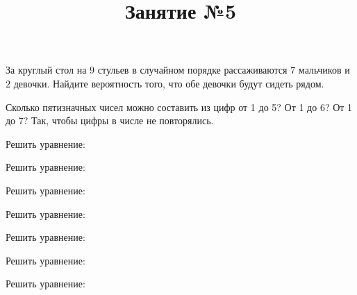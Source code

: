 \title{Занятие №5}
\begin{listofex}
	\item За круглый стол на \( 9 \) стульев в случайном порядке рассаживаются \( 7 \) мальчиков и \( 2 \) девочки. Найдите вероятность того, что обе девочки будут сидеть рядом.
	\item Сколько пятизначных чисел можно составить из цифр от 1 до 5? От 1 до 6? От 1 до 7? Так, чтобы цифры в числе не повторялись.
	\item Решить уравнение:
	\begin{enumcols}[itemcolumns=2]
		\item {}
		\item {}
		\item {}
		\item {}
	\end{enumcols}
	\item Решить уравнение:
	\begin{enumcols}[itemcolumns=3]
		\item {}
		\item {}
		\item {}
	\end{enumcols}
	\item Решить уравнение:
	\begin{enumcols}[itemcolumns=2]
		\item {}
		\item {}
	\end{enumcols}
	\item Решить уравнение:
	\begin{enumcols}[itemcolumns=3]
		\item {}
		\item {}
		\item {}
	\end{enumcols}
	\item Решить уравнение:
	\begin{enumcols}[itemcolumns=2]
		\item {}
		\item {}
	\end{enumcols}
	\item Решить уравнение:
	\begin{enumcols}[itemcolumns=3]
		\item {}
		\item {}
		\item {}
	\end{enumcols}
	\item Решить уравнение:
	\begin{enumcols}[itemcolumns=2]
		\item {}
		\item {}
	\end{enumcols}
\end{listofex}